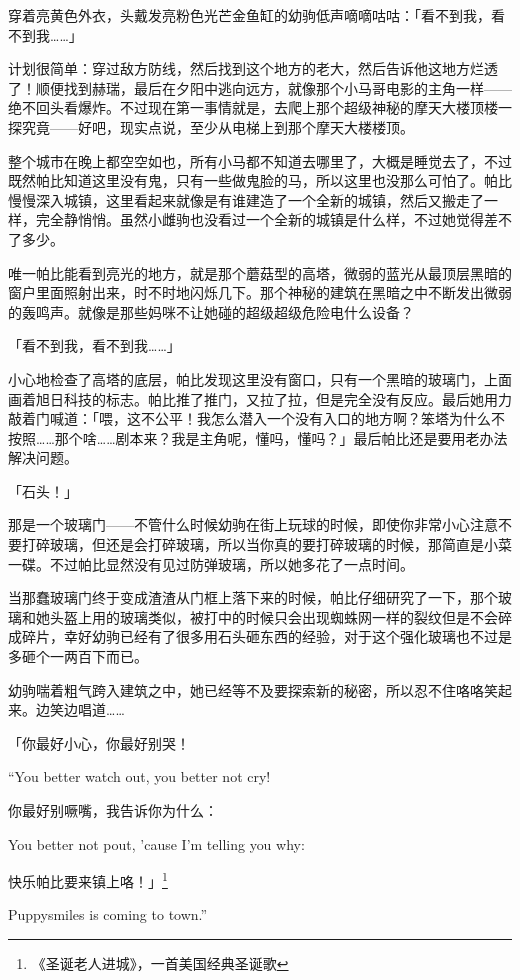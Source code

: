 穿着亮黄色外衣，头戴发亮粉色光芒金鱼缸的幼驹低声嘀嘀咕咕：「看不到我，看不到我……」

计划很简单：穿过敌方防线，然后找到这个地方的老大，然后告诉他这地方烂透了！顺便找到赫瑞，最后在夕阳中逃向远方，就像那个小马哥电影的主角一样——绝不回头看爆炸。不过现在第一事情就是，去爬上那个超级神秘的摩天大楼顶楼一探究竟——好吧，现实点说，至少从电梯上到那个摩天大楼楼顶。

整个城市在晚上都空空如也，所有小马都不知道去哪里了，大概是睡觉去了，不过既然帕比知道这里没有鬼，只有一些做鬼脸的马，所以这里也没那么可怕了。帕比慢慢深入城镇，这里看起来就像是有谁建造了一个全新的城镇，然后又搬走了一样，完全静悄悄。虽然小雌驹也没看过一个全新的城镇是什么样，不过她觉得差不了多少。

唯一帕比能看到亮光的地方，就是那个蘑菇型的高塔，微弱的蓝光从最顶层黑暗的窗户里面照射出来，时不时地闪烁几下。那个神秘的建筑在黑暗之中不断发出微弱的轰鸣声。就像是那些妈咪不让她碰的超级超级危险电什么设备？

「看不到我，看不到我……」

小心地检查了高塔的底层，帕比发现这里没有窗口，只有一个黑暗的玻璃门，上面画着旭日科技的标志。帕比推了推门，又拉了拉，但是完全没有反应。最后她用力敲着门喊道：「喂，这不公平！我怎么潜入一个没有入口的地方啊？笨塔为什么不按照……那个啥……剧本来？我是主角呢，懂吗，懂吗？」最后帕比还是要用老办法解决问题。

「石头！」

那是一个玻璃门——不管什么时候幼驹在街上玩球的时候，即使你非常小心注意不要打碎玻璃，但还是会打碎玻璃，所以当你真的要打碎玻璃的时候，那简直是小菜一碟。不过帕比显然没有见过防弹玻璃，所以她多花了一点时间。

当那蠢玻璃门终于变成渣渣从门框上落下来的时候，帕比仔细研究了一下，那个玻璃和她头盔上用的玻璃类似，被打中的时候只会出现蜘蛛网一样的裂纹但是不会碎成碎片，幸好幼驹已经有了很多用石头砸东西的经验，对于这个强化玻璃也不过是多砸个一两百下而已。

幼驹喘着粗气跨入建筑之中，她已经等不及要探索新的秘密，所以忍不住咯咯笑起来。边笑边唱道……

\begin{song}
「你最好小心，你最好别哭！

``You better watch out, you better not cry!

\medskip

你最好别噘嘴，我告诉你为什么：

You better not pout, 'cause I'm telling you why:

\medskip

快乐帕比要来镇上咯！」\footnote{《圣诞老人进城》，一首美国经典圣诞歌}

Puppysmiles is coming to town.''
\end{song}

